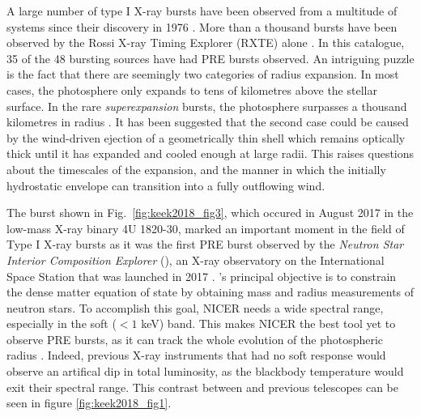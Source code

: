 \documentclass[../main.tex]{subfiles}
\begin{document}
A large number of type I X-ray bursts have been observed from a multitude of systems since their discovery in 1976 \citep{Grindlay1976}. More than a thousand bursts have been observed by the Rossi X-ray Timing Explorer (RXTE) alone \citep{Galloway2008}. In this catalogue, 35 of the 48 bursting sources have had PRE bursts observed. An intriguing puzzle is the fact that there are seemingly two categories of radius expansion. In most cases, the photosphere only expands to tens of kilometres above the stellar surface. In the rare \textit{superexpansion} bursts, the photosphere surpasses a thousand kilometres in radius \citep{IntZand2010}. It has been suggested that the second case could be caused by the wind-driven ejection of a geometrically thin shell which remains optically thick until it has expanded and cooled enough at large radii. This raises questions about the timescales of the expansion, and the manner in which the initially hydrostatic envelope can transition into a fully outflowing wind. 

The burst shown in Fig.~\ref{fig:keek2018_fig3}, which occured in August 2017 in the low-mass X-ray binary 4U 1820-30, marked an important moment in the field of Type I X-ray bursts as it was the first PRE burst observed by the \textit{Neutron Star Interior Composition Explorer} (\Nicer), an X-ray observatory on the International Space Station that was launched in 2017 \citep{Gendreau2017}.  \Nicer's principal objective is to constrain the dense matter equation of state by obtaining mass and radius measurements of neutron stars.  To accomplish this goal, NICER needs a wide spectral range, especially in the soft (${<}1$ keV) band. This makes NICER the best tool yet to observe PRE bursts, as it can track the whole evolution of the photospheric radius \citep{Keek2018a}.  Indeed, previous X-ray instruments that had no soft response would observe an artifical dip in total luminosity, as the blackbody temperature would exit their spectral range. This contrast between {\Nicer} and previous telescopes can be seen in figure \ref{fig:keek2018_fig1}. 
\end{document}
